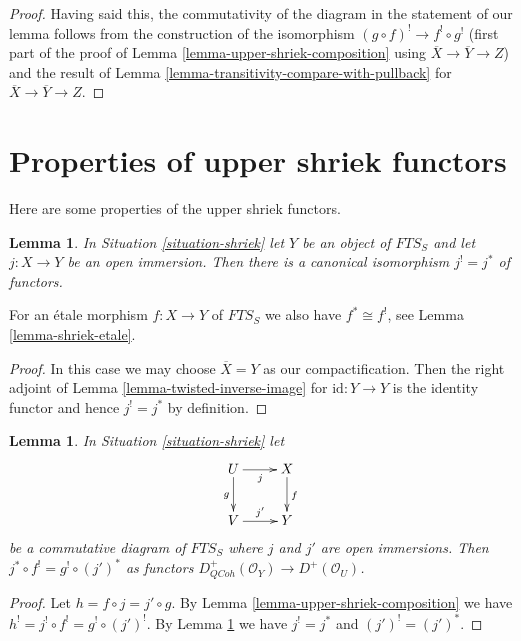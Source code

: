 \documentclass{stacks-project}
\theoremstyle{plain}
\newtheorem{lemma}[subsection]{Lemma}
\theoremstyle{definition}
\theoremstyle{remark}
\numberwithin{equation}{subsection}
\def\QCoh{\mathit{QCoh}}
\begin{document}
\begin{proof}
\medskip\noindent
Having said this, the commutativity of the diagram in the statement
of our lemma follows from the construction of the isomorphism
$(g \circ f)^! \to f^! \circ g^!$ (first part of the proof of
Lemma \ref{lemma-upper-shriek-composition} using
$\overline{X} \to \overline{Y} \to Z$) and the result
of Lemma \ref{lemma-transitivity-compare-with-pullback}
for $\overline{X} \to \overline{Y} \to Z$.
\end{proof}



\section{Properties of upper shriek functors}
\label{section-upper-shriek-properties}

\noindent
Here are some properties of the upper shriek functors.

\begin{lemma}
\label{lemma-shriek-open-immersion}
In Situation \ref{situation-shriek} let $Y$ be an object
of $\textit{FTS}_S$ and let $j : X \to Y$ be an open immersion.
Then there is a canonical isomorphism $j^! = j^*$ of functors.
\end{lemma}

\noindent
For an \'etale morphism $f : X \to Y$ of $\textit{FTS}_S$
we also have $f^* \cong f^!$, see Lemma \ref{lemma-shriek-etale}.

\begin{proof}
In this case we may choose $\overline{X} = Y$ as our compactification.
Then the
right adjoint of Lemma \ref{lemma-twisted-inverse-image} for
$\text{id} : Y \to Y$ is the
identity functor and hence $j^! = j^*$ by definition.
\end{proof}

\begin{lemma}
\label{lemma-restrict-before-or-after}
In Situation \ref{situation-shriek} let
$$
\xymatrix{
U \ar[r]_j \ar[d]_g & X \ar[d]^f \\
V \ar[r]^{j'} & Y
}
$$
be a commutative diagram of $\textit{FTS}_S$ where $j$ and $j'$ are
open immersions. Then $j^* \circ f^! = g^! \circ (j')^*$ as functors
$D^+_\QCoh(\mathcal{O}_Y) \to D^+(\mathcal{O}_U)$.
\end{lemma}

\begin{proof}
Let $h = f \circ j = j' \circ g$. By
Lemma \ref{lemma-upper-shriek-composition} we have
$h^! = j^! \circ f^! = g^! \circ (j')^!$. By
Lemma \ref{lemma-shriek-open-immersion}
we have $j^! = j^*$ and $(j')^! = (j')^*$.
\end{proof}
\end{document}

